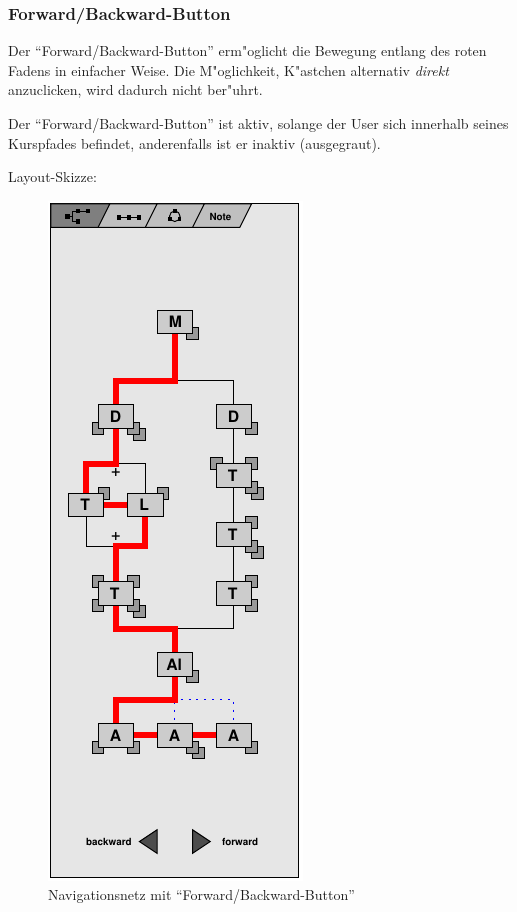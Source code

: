 \clearpage


\subsubsection{Forward/Backward-Button}\label{}

Der ``Forward/Backward-Button'' erm"oglicht die Bewegung entlang des
roten Fadens in einfacher Weise.  Die M"oglichkeit, K"astchen
alternativ \textit{direkt} anzuclicken, wird dadurch nicht ber"uhrt.

Der ``Forward/Backward-Button'' ist aktiv, solange der User sich
innerhalb seines Kurspfades befindet, anderenfalls ist er inaktiv
(ausgegraut).

Layout-Skizze:

\begin{figure}[h]
\begin{center}
\ifx\pdfoutput\undefined
\else
  \includegraphics{Skizzen/navinetz_komplett.pdf}
\fi
\caption{Navigationsnetz mit ``Forward/Backward-Button''}
\end{center}
\end{figure}


